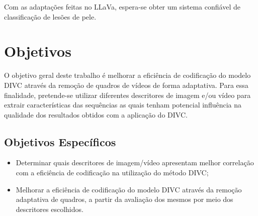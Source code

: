 Com as adaptações feitas no \ac{LLaVa}, espera-se obter um sistema confiável de classificação de lesões de pele.

\section{Objetivos}

O objetivo geral deste trabalho é melhorar a eficiência de codificação do modelo \ac{DIVC} através da remoção de quadros de vídeos de forma adaptativa.
Para essa finalidade, pretende-se utilizar diferentes descritores de imagem e/ou vídeo para extrair características das sequências as quais tenham potencial influência na qualidade dos resultados obtidos com a aplicação do \ac{DIVC}.

\subsection*{Objetivos Específicos}

\begin{itemize}
    \item Determinar quais descritores de imagem/vídeo apresentam melhor correlação com a eficiência de codificação na utilização do método \ac{DIVC};
    \item Melhorar a eficiência de codificação do modelo \ac{DIVC} através da remoção adaptativa de quadros, a partir da avaliação dos mesmos por meio dos descritores escolhidos.
\end{itemize}
